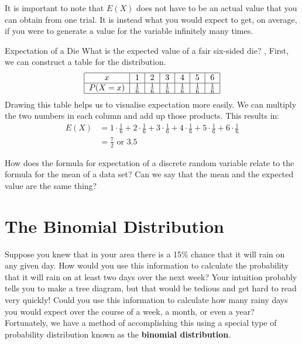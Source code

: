 It is important to note that $E(X)$ does not have to be an actual value that you can obtain from one trial. It is instead what you would expect to get, on average, if you were to generate a value for the variable infinitely many times.

\begin{example}{Expectation of a Die}
What is the expected value of a fair six-sided die?
\sep
First, we can construct a table for the distribution.
\begin{align}
\begin{tabular}{ |c|c|c|c|c|c|c| } 
 \hline
 $x$ & 1 & 2 & 3 & 4 & 5 & 6 \\ 
 \hline
 $P(X=x)$ & $\frac{1}{6}$ & $\frac{1}{6}$ & $\frac{1}{6}$ & $\frac{1}{6}$ & $\frac{1}{6}$ & $\frac{1}{6}$ \\ 
 \hline
\end{tabular}
\end{align}
Drawing this table helps us to visualise expectation more easily. We can multiply the two numbers in each column and add up those products. This results in:
\begin{align}
E(X) &= 1 \cdot \frac{1}6 + 2 \cdot \frac{1}6 + 3 \cdot \frac{1}6 + 4 \cdot \frac{1}6 + 5 \cdot \frac{1}6 + 6 \cdot \frac{1}6 \\
&= \frac{7}2 \text{ or } 3.5
\end{align}
\end{example}

\begin{thinking}
How does the formula for expectation of a discrete random variable relate to the formula for the mean of a data set? Can we say that the mean and the expected value are the same thing?
\end{thinking}

\section{The Binomial Distribution}
Suppose you knew that in your area there is a 15\% chance that it will rain on any given day. How would you use this information to calculate the probability that it will rain on at least two days over the next week? Your intuition probably tells you to make a tree diagram, but that would be tedious and get hard to read very quickly! Could you use this information to calculate how many rainy days you would expect over the course of a week, a month, or even a year? Fortunately, we have a method of accomplishing this using a special type of probability distribution known as the \textbf{binomial distribution}. 


